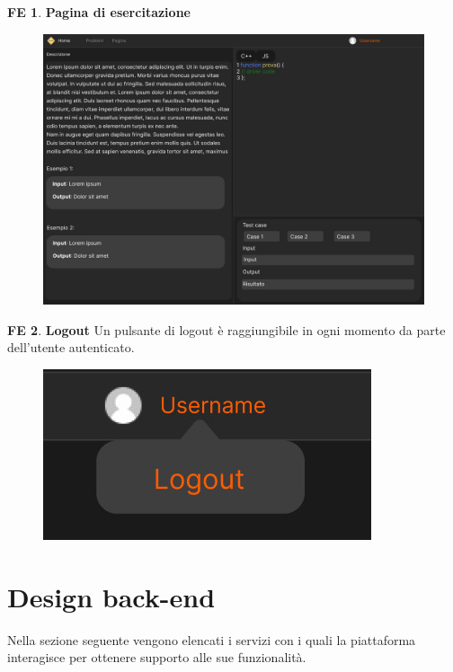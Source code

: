 \documentclass[11pt, a4paper]{article}
\theoremstyle{definition}
\newtheorem{frontend}{FE}
\begin{document}
\begin{frontend}
\textbf{Pagina di esercitazione }

\end{frontend}
\begin{figure}[H]
\centering
\includegraphics[scale=0.195]{materiale/immaginife/esercitazione.jpeg}
\end{figure}

\begin{frontend}
\textbf{Logout }
Un pulsante di logout è raggiungibile in ogni momento da parte dell'utente
autenticato.
\end{frontend}
\begin{figure}[H]
\centering
\includegraphics[scale=0.2]{materiale/immaginife/logout.jpeg}
\end{figure}

\newpage
\section{Design back-end}
Nella sezione seguente vengono elencati i servizi con i quali la piattaforma
interagisce per ottenere supporto alle sue funzionalità.
\end{document}
